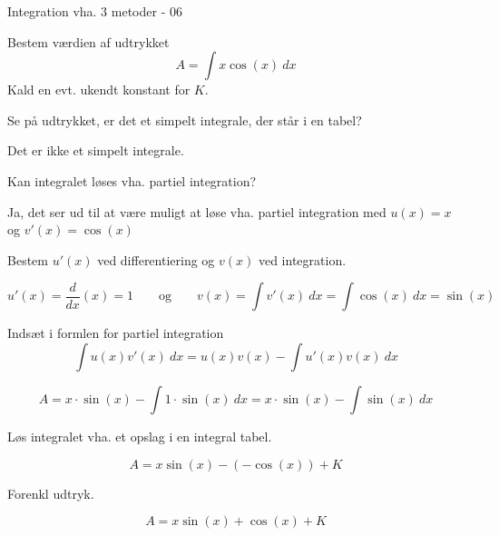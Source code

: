 \documentclass{article}
\begin{document}
\newpage

\begin{exercise}{Integration vha. 3 metoder - 06}
	
	Bestem værdien af udtrykket
	\[
	A = \int x \cos(x) \ dx
	\]
	Kald en evt. ukendt konstant for $K$.
	
	
	\hint
	Se på udtrykket, er det et simpelt integrale, der står i en tabel?
	
	\hint
	Det er ikke et simpelt integrale.
	
	\hint
	Kan integralet løses vha. partiel integration?
	
	\hint
	Ja, det ser ud til at være muligt at løse vha. partiel integration med $u(x)=x$ og $v'(x)=\cos(x)$
	
	\hint
	Bestem $u'(x)$ ved differentiering og $v(x)$ ved integration.
	
	\hint
	\[
	u'(x) = \frac{d}{dx} \left( x \right) = 1 \qquad \textrm{og} \qquad v(x) = \int v'(x) \ dx = \int \cos(x) \ dx = \sin(x)
	\]	
	
	\hint
	Indsæt i formlen for partiel integration
	\[
	\int u(x) v'(x) \ dx = u(x) v(x)  - \int u'(x) v(x) \ dx
	\]
	
	\hint
	\[
	A = x \cdot \sin(x) - \int  1 \cdot  \sin(x) \ dx = x \cdot \sin(x) - \int \sin(x) \ dx
	\]
	
	\hint
	Løs integralet vha. et opslag i en integral tabel.
	
	\hint
	\[
	A = x \sin(x) - (-\cos(x)) + K
	\]
	
	\hint
	Forenkl udtryk.
	
	\hint
	\[
	A = x \sin(x) + \cos(x) + K
	\]
	
\end{exercise}

\newpage
\end{document}
